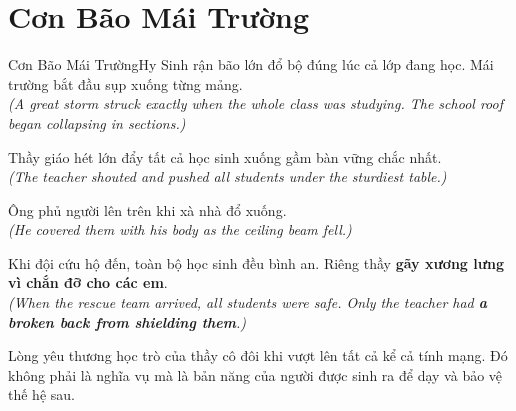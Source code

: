 \section{Cơn Bão Mái Trường}
\begin{truyen}{Cơn Bão Mái Trường}{Hy Sinh}
rận bão lớn đổ bộ đúng lúc cả lớp đang học. Mái trường bắt đầu sụp xuống từng mảng.\\
\textit{(A great storm struck exactly when the whole class was studying. The school roof began collapsing in sections.)}

Thầy giáo hét lớn đẩy tất cả học sinh xuống gầm bàn vững chắc nhất.\\
\textit{(The teacher shouted and pushed all students under the sturdiest table.)}

Ông phủ người lên trên khi xà nhà đổ xuống.\\
\textit{(He covered them with his body as the ceiling beam fell.)}

Khi đội cứu hộ đến, toàn bộ học sinh đều bình an. Riêng thầy \textbf{gãy xương lưng vì chắn đỡ cho các em}.\\
\textit{(When the rescue team arrived, all students were safe. Only the teacher had \textbf{a broken back from shielding them}.)}
\end{truyen}
\begin{baihoc}
  Lòng yêu thương học trò của thầy cô đôi khi vượt lên tất cả kể cả tính mạng. Đó không phải là nghĩa vụ mà là bản năng của người được sinh ra để dạy và bảo vệ thế hệ sau.
\end{baihoc}

